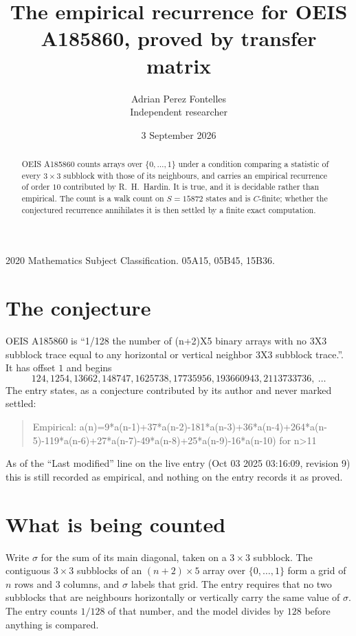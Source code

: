 \documentclass[11pt,a4paper]{article}
\title{The empirical recurrence for OEIS A185860, proved by transfer matrix}
\author{Adrian Perez Fontelles\\ \small Independent researcher}
\date{3 September 2026}
\theoremstyle{plain}
\theoremstyle{definition}
\begin{document}
\maketitle

\begin{abstract}
OEIS A185860 counts arrays over $\{0,\dots,1\}$ under a condition comparing a statistic of
every $3\times3$ subblock with those of its neighbours, and carries an empirical recurrence
of order $10$ contributed by R.~H.~Hardin. It is true, and it is decidable rather than
empirical. The count is a walk count on $S=15872$ states and is $C$-finite; whether the
conjectured recurrence annihilates it is then settled by a finite exact computation.
\end{abstract}

\noindent\small 2020 Mathematics Subject Classification. 05A15, 05B45, 15B36.\normalsize

\section{The conjecture}

OEIS A185860 is ``1/128 the number of (n+2)X5 binary arrays with no 3X3 subblock trace equal to any horizontal or vertical neighbor 3X3 subblock trace.''. It has offset $1$ and begins
\[
124, 1254, 13662, 148747, 1625738, 17735956, 193660943, 2113733736,\ \dots
\]
The entry states, as a conjecture contributed by its author and never marked settled:
\begin{quote}
Empirical: a(n)=9*a(n-1)+37*a(n-2)-181*a(n-3)+36*a(n-4)+264*a(n-5)-119*a(n-6)+27*a(n-7)-49*a(n-8)+25*a(n-9)-16*a(n-10) for n>11
\end{quote}
As of the ``Last modified'' line on the live entry (Oct 03 2025 03:16:09, revision 9) this is still
recorded as empirical, and nothing on the entry records it as proved.

\section{What is being counted}

Write $\sigma$ for the sum of its main diagonal, taken on a $3\times3$ subblock. The contiguous $3\times3$
subblocks of an $(n+2)\times5$ array over $\{0,\dots,1\}$ form a grid of $n$ rows
and $3$ columns, and $\sigma$ labels that grid. The entry
requires that no two subblocks that are neighbours horizontally or vertically carry the same value of $\sigma$. The entry counts $1/128$ of that number, and the model divides by $128$ before anything is compared.
\end{document}
